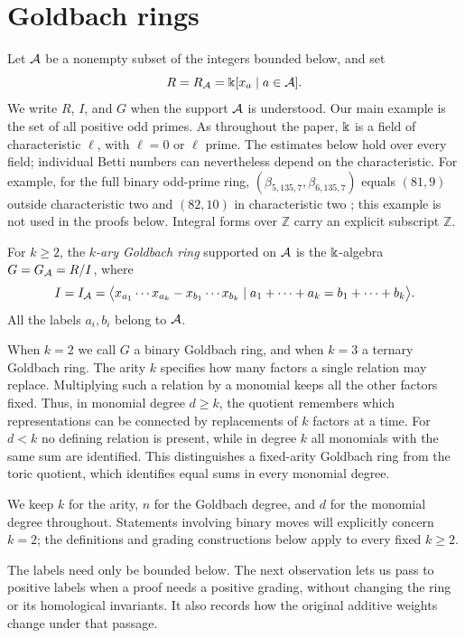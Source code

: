 \section{Goldbach rings}
\label{sec:setup}

Let $\mathcal A$ be a nonempty subset of the integers bounded below, and set
\[
 R=R_\mathcal A=\Bbbk[x_a\mid a\in\mathcal A].
\]
We write $R$, $I$, and $G$ when the support $\mathcal A$ is understood.
Our main example is the set of all positive odd primes. As throughout
the paper, $\Bbbk$ is a field of characteristic $\ell$, with $\ell=0$
or $\ell$ prime. The estimates below hold over every field; individual
Betti numbers can nevertheless depend on the characteristic. For example,
for the full binary odd-prime ring,
$(\beta_{5,135,7},\beta_{6,135,7})$ equals $(81,9)$ outside
characteristic two and $(82,10)$ in characteristic two
\cite[Theorem~6.3]{CompanionTopology}; this example is not used in the
proofs below. Integral forms over $\mathbb Z$ carry an
explicit subscript $\mathbb Z$.

\begin{definition}
For $k\ge2$, the \emph{$k$-ary Goldbach ring} supported on $\mathcal A$ is
the $\Bbbk$-algebra $G=G_\mathcal A=R/I$, where
\begin{equation}\label{setup:relation-ideal}
 I=I_\mathcal A=
 \bigl\langle x_{a_1}\cdots x_{a_k}-x_{b_1}\cdots x_{b_k}
 \mid a_1+\cdots+a_k=b_1+\cdots+b_k\bigr\rangle .
\end{equation}
All the labels $a_i,b_i$ belong to $\mathcal A$.
\end{definition}
When $k=2$ we call $G$ a binary Goldbach ring, and when $k=3$ a
ternary Goldbach ring. The arity $k$ specifies how many factors a
single relation may replace.
Multiplying such a relation by a monomial keeps all the other factors
fixed. Thus, in monomial degree $d\ge k$, the quotient remembers which
representations can be connected by replacements of $k$ factors at a
time. For $d<k$ no defining relation is present, while in degree $k$
all monomials with the same sum are identified. This distinguishes a
fixed-arity Goldbach ring from the toric quotient, which identifies
equal sums in every monomial degree.

We keep $k$ for the arity, $n$ for the Goldbach degree, and $d$ for the
monomial degree throughout. Statements involving binary moves will
explicitly concern $k=2$; the definitions and grading constructions
below apply to every fixed $k\ge2$.

The labels need only be bounded below. The next observation lets us
pass to positive labels when a proof needs a positive grading, without
changing the ring or its homological invariants. It also records how
the original additive weights change under that passage.

